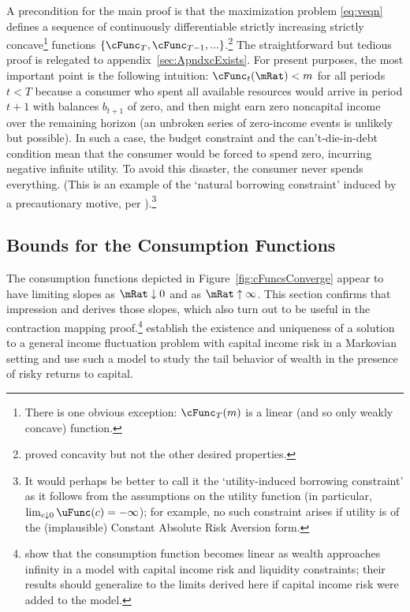 \documentclass[BufferStockTheory]{subfiles}
\begin{document}
A precondition for the main proof is that the maximization problem \eqref{eq:veqn} defines a sequence of continuously differentiable strictly increasing strictly concave\footnote{There is one obvious exception: $\cFunc_{T}(m)$ is a linear (and so only weakly concave) function.} functions $\{\cFunc_{T},\cFunc_{T-1},...\}$.\footnote{\cite{ckConcavity} proved concavity but not the other desired properties.}  The straightforward but tedious proof is relegated to appendix~\ref{sec:ApndxcExists}.  For present purposes, the most important point is the following intuition: $\cFunc_{t}(\mRat) < m$ for all periods $t < T$ because a consumer who spent all available resources would arrive in period $t+1$ with balances $b_{t+1}$ of zero, and then might earn zero noncapital income over the remaining horizon (an unbroken series of zero-income events is unlikely but possible).  In such a case, the budget constraint and the can't-die-in-debt condition mean that the consumer would be forced to spend zero, incurring negative infinite utility.  To avoid this disaster, the consumer never spends everything.  (This is an example of the `natural borrowing constraint' induced by a precautionary motive, per \cite{zeldesStochastic}).\footnote{It would perhaps be better to call it the `utility-induced borrowing constraint' as it follows from the assumptions on the utility function (in particular, $\lim_{c \downarrow 0} \uFunc(c)=-\infty$); for example, no such constraint arises if utility is of the (implausible) Constant Absolute Risk Aversion form.}

\hypertarget{Bounds-for-the-Consumption-Functions}{}
\subsection{Bounds for the Consumption Functions}

The consumption functions depicted in Figure~\ref{fig:cFuncsConverge} appear
to have limiting slopes as $\mRat \downarrow 0$ and as $\mRat \uparrow
\infty$.  This section confirms that impression and derives those
slopes, which also turn out to be useful in the contraction
mapping proof.\footnote{\cite{benhabibWealth} show that the consumption function
becomes linear as wealth approaches infinity in a model with capital income risk and liquidity
constraints; their results should generalize to the limits derived here if capital income risk were added to the model.}  \cite{MaStachurskiToda2020JET} establish the existence and uniqueness of a solution to a general income fluctuation problem with capital income risk in a Markovian setting and use such a model to study the tail behavior of wealth in the presence of risky returns to capital.
\end{document}
